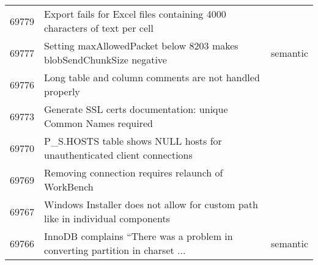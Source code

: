 \begin{longtable}[c]{p{1cm}p{10cm}p{1cm}}
69779 & Export fails for Excel files containing  4000 characters of text per cell &  \\
69777 & Setting maxAllowedPacket below 8203 makes blobSendChunkSize negative & semantic \\
69776 & Long table and column comments are not handled properly &  \\
69773 & Generate SSL certs documentation: unique Common Names required &  \\
69770 & P\_S.HOSTS table shows NULL hosts for unauthenticated client connections &  \\
69769 & Removing connection requires relaunch of WorkBench &  \\
69767 & Windows Installer does not allow for custom path like in individual components &  \\
69766 & InnoDB complains ``There was a problem in converting partition in charset ... & semantic
\end{longtable}
